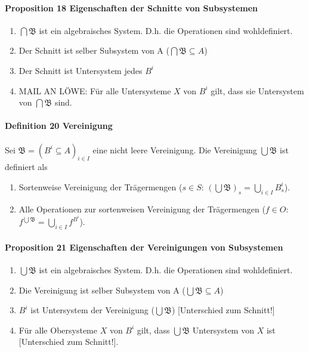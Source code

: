 \paragraph{Proposition 18 Eigenschaften der Schnitte von Subsystemen}
\begin{enumerate}
\item $\bigcap\mathfrak{B}$ ist ein algebraisches System. D.h. die Operationen sind wohldefiniert.
\item Der Schnitt ist selber Subsystem von A ($\bigcap\mathfrak{B} \subseteq A$)
\item Der Schnitt ist Untersystem jedes $B^i$
\item MAIL AN LÖWE: Für alle Untersysteme $X$ von $B^i$ gilt, dass sie Untersystem von $\bigcap\mathfrak{B}$ sind.
\end{enumerate}

\paragraph{Definition 20 Vereinigung}
Sei $\mathfrak{B}=\left(B^{i}\subseteq A\right)_{i\in I}$ eine nicht leere Vereinigung.
Die Vereinigung $\bigcup\mathfrak{B}$ ist definiert als 
\begin{enumerate}
\item Sortenweise Vereinigung der Trägermengen ($s\in S$: $\left(\bigcup\mathfrak{B}\right)_{s}=\bigcup_{i\in I}B_{s}^{i}$).
\item Alle Operationen zur sortenweisen Vereinigung der Trägermengen ($f\in O$: $f^{\bigcup\mathfrak{B}}=\bigcup_{i\in I}f^{B^{i}}$).
\end{enumerate}

\paragraph{Proposition 21 Eigenschaften der Vereinigungen von Subsystemen}
\begin{enumerate}
\item $\bigcup\mathfrak{B}$ ist ein algebraisches System. D.h. die Operationen sind wohldefiniert.
\item Die Vereinigung ist selber Subsystem von A ($\bigcup\mathfrak{B} \subseteq A$)
\item $B^i$ ist Untersystem der Vereinigung ($\bigcup\mathfrak{B}$) [Unterschied zum Schnitt!]
\item Für alle Obersysteme $X$ von $B^i$ gilt, dass $\bigcup\mathfrak{B}$ Untersystem von $X$ ist [Unterschied zum Schnitt!].
\end{enumerate}

